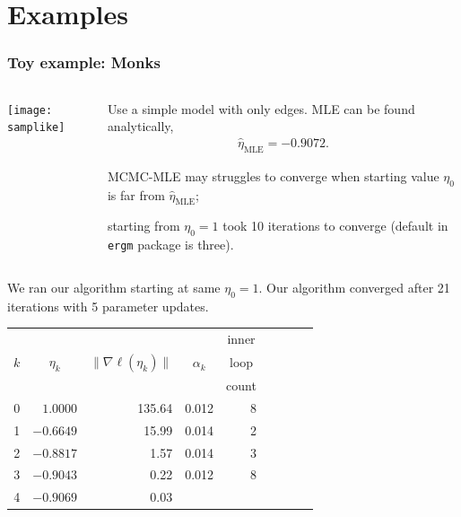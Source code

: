 \documentclass[slidestop,compress, 10pt]{beamer}
\newcommand{\etaMLE}{\hat{\eta}_{\textrm{MLE}}}
\begin{document}
\section{Examples}
\frame
{
  \frametitle{Toy example: Monks}  

\begin{columns}[t]
\begin{column}[T]{0.3\textwidth}
\texttt{[image: samplike]}
\end{column}

\begin{column}[r]{0.7\textwidth}
Use a simple model with only edges.  MLE can be 
found analytically,
\begin{align*}
	\etaMLE = -0.9072.
\end{align*}

\pause
MCMC-MLE may struggles to converge when
starting value $\eta_0$ is far from $\etaMLE$;

starting from $\eta_0 = 1$ took
10 iterations to converge (default in \texttt{ergm} package is three).
\end{column}
\end{columns}

\pause
We ran our algorithm starting at same $\eta_0=1$.  Our algorithm converged
after 21 iterations with 5 parameter updates.
{\footnotesize
\begin{table}
\begin{center}
\begin{tabular}{rrrrrrlrr}
  \hline
    &  &  &  & \multicolumn{1}{c}{inner}\\
  \multicolumn{1}{c}{$k$} & 
  \multicolumn{1}{c}{$\eta_k$} &
  \multicolumn{1}{c}{$\lVert \nabla \ell(\eta_k) \rVert$} &
  \multicolumn{1}{c}{$\alpha_k$} &
  \multicolumn{1}{c}{loop }\\
    &  &  &  & \multicolumn{1}{c}{count}\\
  \hline
   0 &  $1.0000$ & 135.64 &  0.012 & 8\\
   1 & $-0.6649$ & 15.99  &  0.014 & 2 \\
   2 & $-0.8817$ & 1.57   &  0.014 & 3 \\
   3 & $-0.9043$ & 0.22   &  0.012 & 8 \\
   4 & $-0.9069$ & 0.03   &  &  \\
   \hline
\end{tabular} \label{T:Sampson redo}
\end{center}
\end{table}}
}
\end{document}
